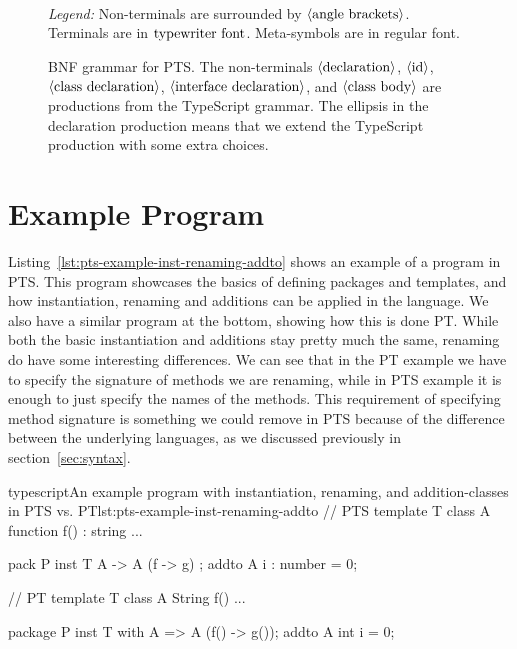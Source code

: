 \begin{figure}
\begin{bnf*}
        {  \bnfsp \bnfts{->} \bnfsp {} }\\
        {  \bnfsp {} \bnfsp {} \bnfsp {} }\\
        {  \bnfor \bnfes }\\
    \end{bnf*}
    \caption{BNF grammar for PTS. The non-terminals $\langle \textrm{declaration} \rangle$, $\langle \textrm{id} \rangle$, $\langle \textrm{class declaration} \rangle$, $\langle \textrm{interface declaration} \rangle$, and $\langle \textrm{class body} \rangle$ are productions from the TypeScript grammar.
    The ellipsis in the declaration production means that we extend the TypeScript production with some extra choices.}

    \textit{Legend:} Non-terminals are surrounded by $\langle \textrm{angle brackets} \rangle$.
    Terminals are in $\textrm{typewriter font}$.
    Meta-symbols are in regular font.
    \label{fig:pts-grammar}
\end{figure}

\section{Example Program}\label{sec:example-program}

Listing~\vref{lst:pts-example-inst-renaming-addto} shows an example of a program in PTS\@.
This program showcases the basics of defining packages and templates, and how instantiation, renaming and additions can be applied in the language.
We also have a similar program at the bottom, showing how this is done PT\@.
While both the basic instantiation and additions stay pretty much the same, renaming do have some interesting differences.
We can see that in the PT example we have to specify the signature of methods we are renaming, while in PTS example it is enough to just specify the names of the methods.
This requirement of specifying method signature is something we could remove in PTS because of the difference between the underlying languages, as we discussed previously in section~\vref{sec:syntax}.

\begin{code}{typescript}{An example program with instantiation, renaming, and addition-classes in PTS vs. PT}{lst:pts-example-inst-renaming-addto}
    // PTS
    template T {
        class A {
            function f() : string {
                ...
            }
        }
    }

    pack P {
        inst T { A -> A (f -> g) };
        addto A {
            i : number = 0;
        }
    }

    // PT
    template T {
        class A {
            String f() {
                ...
            }
        }
    }

    package P {
        inst T with A => A (f() -> g());
        addto A {
            int i = 0;
        }
    }
\end{code}
